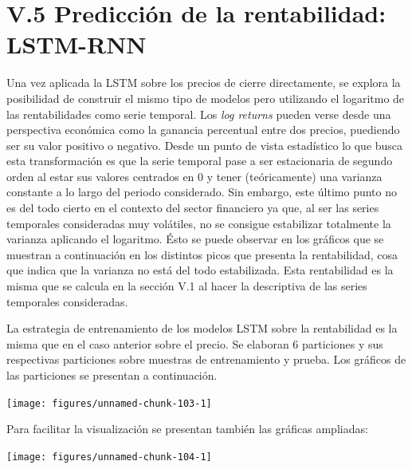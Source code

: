 \documentclass[]{DissertateUSU}
\begin{document}
\FloatBarrier
{}
\fancyfoot[C]{\thepage}

\section{V.5 \textbf{Predicción de la rentabilidad: LSTM-RNN}}

\noindent Una vez aplicada la LSTM sobre los precios de cierre
directamente, se explora la posibilidad de construir el mismo tipo de
modelos pero utilizando el logaritmo de las rentabilidades como serie
temporal. Los \emph{log returns} pueden verse desde una perspectiva
económica como la ganancia percentual entre dos precios, puediendo ser
su valor positivo o negativo. Desde un punto de vista estadístico lo que
busca esta transformación es que la serie temporal pase a ser
estacionaria de segundo orden al estar sus valores centrados en 0 y
tener (teóricamente) una varianza constante a lo largo del periodo
considerado. Sin embargo, este último punto no es del todo cierto en el
contexto del sector financiero ya que, al ser las series temporales
consideradas muy volátiles, no se consigue estabilizar totalmente la
varianza aplicando el logaritmo. Ésto se puede observar en los gráficos
que se muestran a continuación en los distintos picos que presenta la
rentabilidad, cosa que indica que la varianza no está del todo
estabilizada. Esta rentabilidad es la misma que se calcula en la sección
V.1 al hacer la descriptiva de las series temporales consideradas.

\justifying

\noindent La estrategia de entrenamiento de los modelos LSTM sobre la
rentabilidad es la misma que en el caso anterior sobre el precio. Se
elaboran 6 particiones y sus respectivas particiones sobre muestras de
entrenamiento y prueba. Los gráficos de las particiones se presentan a
continuación.

\begin{center}\texttt{[image: figures/unnamed-chunk-103-1]} \end{center}
\centering

\setlength\parskip{5ex}
\justifying

\noindent Para facilitar la visualización se presentan también las
gráficas ampliadas:

\begin{center}\texttt{[image: figures/unnamed-chunk-104-1]} \end{center}
\centering
\end{document}
